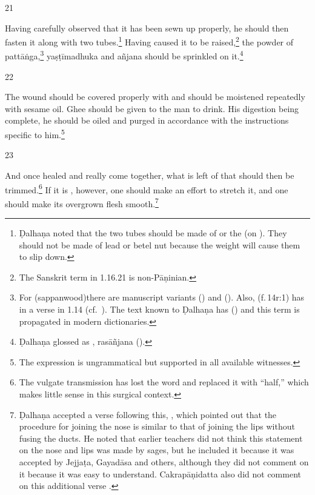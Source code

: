 \begin{translation}
\item[21] 
\begin{em}
Having carefully observed that it has been sewn up properly, he should then
fasten it along with two tubes.\footnote{Ḍalhaṇa noted that the two tubes
    should be made of  or the
     (on
    ). They should not be made of lead or betel nut because the
    weight will cause them to slip down.} Having caused it to be
    raised,\footnote{The Sanskrit term  in 1.16.21 is
        non-Pāṇinian.} the powder of \gls{pattāṅga},\footnote{\label{pattanga} For
             (sappanwood)there are manuscript variants 
            () and  ().  Also,  (f.\,14r:1) has  in
            a verse in 1.14 (cf.\ ). The text known to Ḍalhaṇa has
             () and this term is propagated in modern
            dictionaries.} \gls{yaṣṭīmadhuka} %
            and \gls{añjana} should be sprinkled on it.\footnote{Ḍalhaṇa
                glossed  as , \gls{rasāñjana}
                (\cite[81]{vulgate}).}
\end{em}    
\item[22] 
\begin{em}
 The wound should be covered properly with  and should be
moistened repeatedly with sesame oil.  Ghee should be given to the man to drink. 
His digestion being complete, he should be oiled and purged in accordance with
the instructions specific to him.\footnote{The expression 
    is ungrammatical but supported in all available witnesses.}
\end{em}
    
\item[23] %
\begin{em}
And once healed and really come together, what is left of that
 should then be trimmed.\footnote{The vulgate
    transmission has lost the word  and replaced it with 
    “half,” which makes little sense in this surgical  context.} If it is
    , however, one should make an effort to stretch it,
    and one should make its overgrown flesh smooth.\footnote{Ḍalhaṇa accepted a
        verse following this, , which pointed out that the procedure
        for joining the nose is similar to that of joining the lips without fusing the
        ducts. He noted that earlier teachers did not think this statement on the nose
        and lips was made by sages, but he included it because it was accepted by
        Jejjaṭa, Gayadāsa and others, although they did not comment on it because it
        was easy to understand. Cakrapāṇidatta also did not comment on this additional
        verse \citep[133]{acar-1939}.}

\end{em}    
    
\end{translation}    
